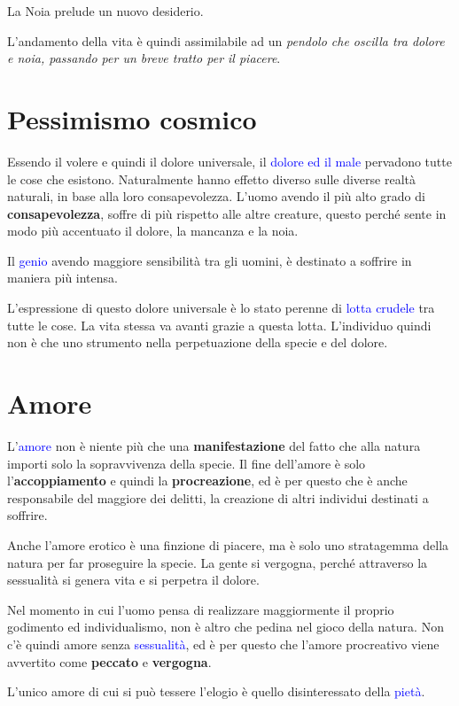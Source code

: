 \documentclass[a4paper, twoside, titlepage]{book}
\renewcommand{\emph}[1]{\textcolor{blue}{#1}}
\begin{document}
La Noia prelude un nuovo desiderio.

L’andamento della vita è quindi assimilabile ad un \textit{pendolo che oscilla tra dolore e noia, passando per un breve tratto per il piacere}.

\chapter{Pessimismo cosmico}

Essendo il volere e quindi il dolore universale, il \emph{dolore ed il male} pervadono tutte le cose che esistono. Naturalmente hanno effetto diverso sulle diverse realtà naturali, in base alla loro consapevolezza. L’uomo avendo il più alto grado di \textbf{consapevolezza}, soffre di più rispetto alle altre creature, questo perché sente in modo più accentuato il dolore, la mancanza e la noia.

Il \emph{genio} avendo maggiore sensibilità tra gli uomini, è destinato a soffrire in maniera più intensa.

L’espressione di questo dolore universale è lo stato perenne di \emph{lotta crudele} tra tutte le cose. La vita stessa va avanti grazie a questa lotta. L’individuo quindi non è che uno strumento nella perpetuazione della specie e del dolore.

\chapter{Amore}

L’\emph{amore} non è niente più che una \textbf{manifestazione} del fatto che alla natura importi solo la sopravvivenza della specie. Il fine dell’amore è solo l’\textbf{accoppiamento} e quindi la \textbf{procreazione}, ed è per questo che è anche responsabile del maggiore dei delitti, la creazione di altri individui destinati a soffrire.

Anche l'amore erotico è una finzione di piacere, ma è solo uno stratagemma della natura per far proseguire la specie. La gente si vergogna, perché attraverso la sessualità si genera vita e si perpetra il dolore.

Nel momento in cui l’uomo pensa di realizzare maggiormente il proprio godimento ed individualismo, non è altro che pedina nel gioco della natura. Non c’è quindi amore senza \emph{sessualità}, ed è per questo che l’amore procreativo viene avvertito come \textbf{peccato} e \textbf{vergogna}.

L’unico amore di cui si può tessere l’elogio è quello disinteressato della \emph{pietà}.
\end{document}
